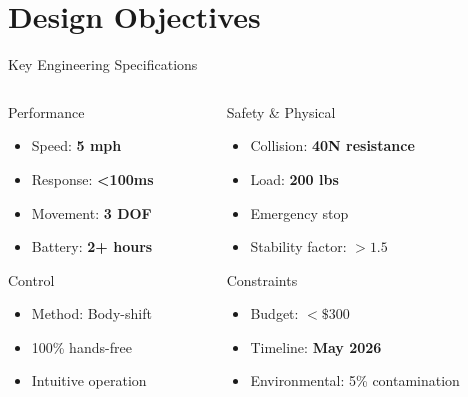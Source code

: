 \documentclass[aspectratio=169]{beamer}
\begin{document}
\section{Design Objectives}

\begin{frame}{Key Engineering Specifications}
\begin{columns}[T]
\begin{column}{0.48\textwidth}
\begin{block}{Performance}
\begin{itemize}
    \item Speed: \textbf{5 mph}
    \item Response: \textbf{<100ms}
    \item Movement: \textbf{3 DOF}
    \item Battery: \textbf{2+ hours}
\end{itemize}
\end{block}

\begin{block}{Control}
\begin{itemize}
    \item Method: Body-shift
    \item 100\% hands-free
    \item Intuitive operation
\end{itemize}
\end{block}
\end{column}

\begin{column}{0.48\textwidth}
\begin{block}{Safety \& Physical}
\begin{itemize}
    \item Collision: \textbf{40N resistance}
    \item Load: \textbf{200 lbs}
    \item Emergency stop
    \item Stability factor: $>1.5$
\end{itemize}
\end{block}

\begin{block}{Constraints}
\begin{itemize}
    \item Budget: \textbf{$<\$300$}
    \item Timeline: \textbf{May 2026}
    \item Environmental: 5\% contamination
\end{itemize}
\end{block}
\end{column}
\end{columns}
\end{frame}
\end{document}
